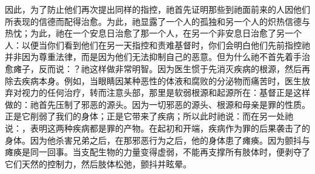 因此，为了防止他们再次提出同样的指控，祂首先证明那些到祂面前来的人因他们所表现的信德而配得治愈。为此，祂显露了一个人的孤独和另一个人的炽热信德与热忱；为此，祂在一个安息日治愈了那一个人，在另一个非安息日治愈了另一个人：以便当你们看到他们在另一天指控和责难基督时，你们会明白他们先前指控祂并非因为尊重法律，而是因为他们无法抑制自己的恶意。但为什么祂不首先着手治愈瘫子，反而说：？祂这样做非常明智。因为医生惯于先消灭疾病的根源，然后再除去疾病本身。例如，当眼睛因某种恶性的体液和腐败的分泌物而痛苦时，医生放弃对视力的任何治疗，转而注意头部，那里是软弱根源和起源所在：基督正是这样做的：祂首先压制了邪恶的源头。因为一切邪恶的源头、根源和母亲是罪的性质。正是它削弱了我们的身体；正是它带来了疾病；所以此时祂说：而在另一处祂说：，表明这两种疾病都是罪的产物。在起初和开端，疾病作为罪的后果袭击了的身体。因为他杀害兄弟之后，在那邪恶行为之后，他的身体患了瘫痪。因为颤抖与瘫痪是同一回事。当支配生物的力量变得虚弱，不能再支撑所有肢体时，便剥夺了它们天然的控制力，然后肢体松弛，颤抖并眩晕。\par

